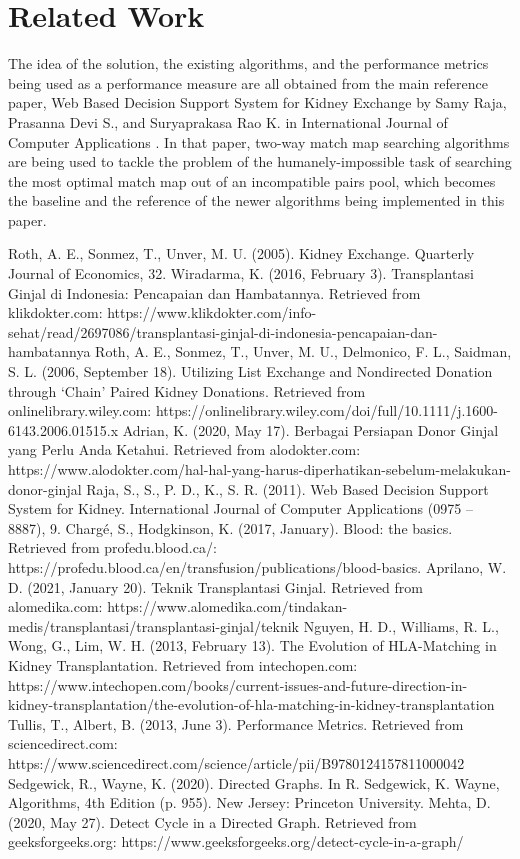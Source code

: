 \documentclass[conference]{IEEEtran}
\begin{document}
\section{Related Work}
The idea of the solution, the existing algorithms, and the performance metrics being used as a performance measure are all obtained from
the main reference paper, Web Based Decision Support System for Kidney Exchange by Samy Raja, Prasanna Devi S., and Suryaprakasa Rao K. in
International Journal of Computer Applications \cite{raja}. In that paper, two-way match map searching algorithms are being used to tackle
the problem of the humanely-impossible task of searching the most optimal match map out of an incompatible pairs pool, which becomes the baseline
and the reference of the newer algorithms being implemented in this paper.

\begin{thebibliography}{00}
 Roth, A. E., Sonmez, T., Unver, M. U. (2005). Kidney Exchange. Quarterly Journal of Economics, 32.
 Wiradarma, K. (2016, February 3). Transplantasi Ginjal di Indonesia: Pencapaian dan Hambatannya. Retrieved from klikdokter.com: https://www.klikdokter.com/info-sehat/read/2697086/transplantasi-ginjal-di-indonesia-pencapaian-dan-hambatannya
 Roth, A. E., Sonmez, T., Unver, M. U., Delmonico, F. L., Saidman, S. L. (2006, September 18). Utilizing List Exchange and Nondirected Donation through ‘Chain’ Paired Kidney Donations. Retrieved from onlinelibrary.wiley.com: https://onlinelibrary.wiley.com/doi/full/10.1111/j.1600-6143.2006.01515.x
 Adrian, K. (2020, May 17). Berbagai Persiapan Donor Ginjal yang Perlu Anda Ketahui. Retrieved from alodokter.com: https://www.alodokter.com/hal-hal-yang-harus-diperhatikan-sebelum-melakukan-donor-ginjal
 Raja, S., S., P. D., K., S. R. (2011). Web Based Decision Support System for Kidney. International Journal of Computer Applications (0975 – 8887), 9.
 Chargé, S., Hodgkinson, K. (2017, January). Blood: the basics. Retrieved from profedu.blood.ca/: https://profedu.blood.ca/en/transfusion/publications/blood-basics.
 Aprilano, W. D. (2021, January 20). Teknik Transplantasi Ginjal. Retrieved from alomedika.com: https://www.alomedika.com/tindakan-medis/transplantasi/transplantasi-ginjal/teknik
 Nguyen, H. D., Williams, R. L., Wong, G., Lim, W. H. (2013, February 13). The Evolution of HLA-Matching in Kidney Transplantation. Retrieved from intechopen.com: https://www.intechopen.com/books/current-issues-and-future-direction-in-kidney-transplantation/the-evolution-of-hla-matching-in-kidney-transplantation
 Tullis, T., Albert, B. (2013, June 3). Performance Metrics. Retrieved from sciencedirect.com: https://www.sciencedirect.com/science/article/pii/B9780124157811000042
 Sedgewick, R., Wayne, K. (2020). Directed Graphs. In R. Sedgewick, K. Wayne, Algorithms, 4th Edition (p. 955). New Jersey: Princeton University.
 Mehta, D. (2020, May 27). Detect Cycle in a Directed Graph. Retrieved from geeksforgeeks.org: https://www.geeksforgeeks.org/detect-cycle-in-a-graph/
\end{thebibliography}
\end{document}
